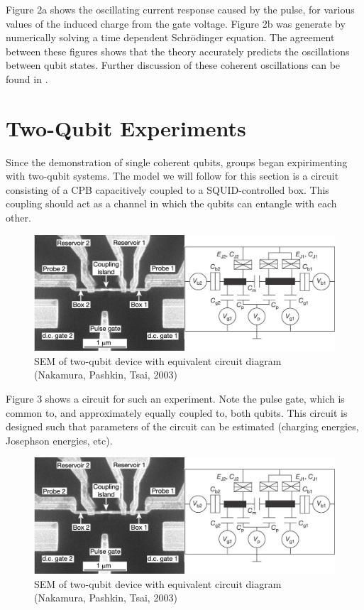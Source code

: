 \documentclass[12pt,letterpaper,notitlepage]{report}
\begin{document}
Figure 2a shows the oscillating current response caused by the pulse, for various values of the induced charge from the gate voltage. Figure 2b was generate by numerically solving a time dependent Schr{\"o}dinger equation. The agreement between these figures shows that the theory accurately predicts the oscillations between qubit states. Further discussion of these coherent oscillations can be found in \cite{singleCPB}.

%
%

\section*{Two-Qubit Experiments}

Since the demonstration of single coherent qubits, groups began expirimenting with two-qubit systems. The model we will follow for this section is a circuit consisting of a CPB capacitively coupled to a SQUID-controlled box. This coupling should act as a channel in which the qubits can entangle with each other.

\begin{figure}[ht]
    \centering
    \includegraphics[width=\textwidth]{img/two-qubit-circuit.jpg}
    \caption{SEM of two-qubit device with equivalent circuit diagram (Nakamura, Pashkin, Tsai, 2003) \cite{onePulseGateNature}}
\end{figure}

Figure 3 shows a circuit for such an experiment. Note the pulse gate, which is common to, and approximately equally coupled to, both qubits. This circuit is designed such that parameters of the circuit can be estimated (charging energies, Josephson energies, etc).

\begin{figure}[ht]
    \centering
    \includegraphics[width=\textwidth]{img/two-qubit-circuit.jpg}
    \caption{SEM of two-qubit device with equivalent circuit diagram (Nakamura, Pashkin, Tsai, 2003) \cite{onePulseGateNature}}
\end{figure}



\end{document}
